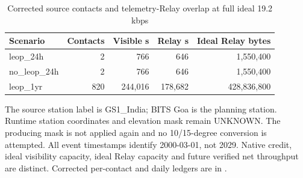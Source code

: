 \begin{table}[H]\centering\small
\caption{Corrected source contacts and telemetry-Relay overlap at full ideal 19.2 kbps}\label{tab:gs-v3-capacity}
\begin{tabularx}{\linewidth}{@{}Xrrrr@{}}\toprule
Scenario & Contacts & Visible s & Relay s & Ideal Relay bytes\\\midrule
leop\_24h & 2 & 766 & 646 & 1,550,400\\
no\_leop\_24h & 2 & 766 & 646 & 1,550,400\\
leop\_1yr & 820 & 244,016 & 178,682 & 428,836,800\\
\bottomrule\end{tabularx}\end{table}
The source station label is GS1\_India; BITS Goa is the planning station. Runtime station coordinates and elevation mask remain UNKNOWN. The producing mask is not applied again and no 10/15-degree conversion is attempted. All event timestamps identify 2000-03-01, not 2029. Native credit, ideal visibility capacity, ideal Relay capacity and future verified net throughput are distinct. Corrected per-contact and daily ledgers are in .